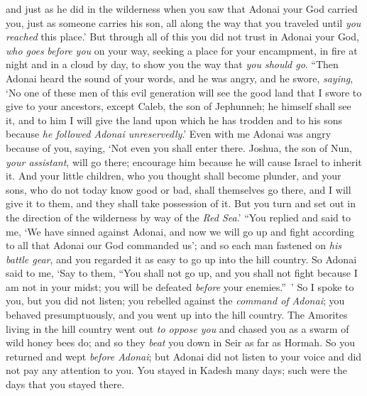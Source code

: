 \begin{biblechapter}
\verse and just as he did in the wilderness when you saw that Adonai your God carried you, just as someone carries his son, all along the way that you traveled until \textit{you reached} this place.’
\verse But through all of this you did not trust in Adonai your God,
\verse \textit{who goes} \textit{before you} on your way, seeking a place for your encampment, in fire at night and in a cloud by day, to show you the way that \textit{you should go}.
\verse “Then Adonai heard the sound of your words, and he was angry, and he swore, \textit{saying},
\verse ‘No one of these men of this evil generation will see the good land that I swore to give to your ancestors,
\verse except Caleb, the son of Jephunneh; he himself shall see it, and to him I will give the land upon which he has trodden and to his sons because \textit{he followed Adonai unreservedly}.’
\verse Even with me Adonai was angry because of you, saying, ‘Not even you shall enter there.
\verse Joshua, the son of Nun, \textit{your assistant}, will go there; encourage him because he will cause Israel to inherit it.
\verse And your little children, who you thought shall become plunder, and your sons, who do not today know good or bad, shall themselves go there, and I will give it to them, and they shall take possession of it.
\verse But you turn and set out in the direction of the wilderness by way of the \textit{Red Sea}.’
\verse “You replied and said to me, ‘We have sinned against Adonai, and now we will go up and fight according to all that Adonai our God commanded us’; and so each man fastened on \textit{his battle gear}, and you regarded it as easy to go up into the hill country.
\verse So Adonai said to me, ‘Say to them, “You shall not go up, and you shall not fight because I am not in your midst; you will be defeated \textit{before} your enemies.” ’
\verse So I spoke to you, but you did not listen; you rebelled against the \textit{command of Adonai}; you behaved presumptuously, and you went up into the hill country.
\verse The Amorites living in the hill country went out \textit{to oppose you} and chased you as a swarm of wild honey bees do; and so they \textit{beat} you down in Seir as far as Hormah.
\verse So you returned and wept \textit{before Adonai}; but Adonai did not listen to your voice and did not pay any attention to you.
\verse You stayed in Kadesh many days; such were the days that you stayed there.
\end{biblechapter}

